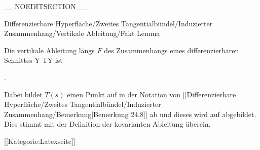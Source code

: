 __NOEDITSECTION__

{Differenzierbare Hyperfläche/Zweites Tangentialbündel/Induzierter Zusammenhang/Vertikale Ableitung/Fakt}
{Lemma}
{}
{

\faktzusatz {}
\faktzusatz {}

}
{

Die vertikale Ableitung längs $F$  des Zusammenhangs eines differenzierbaren Schnittes
 { Y } { TY
} {}
ist

 { . }

Dabei bildet $T(s)$ einen Punkt
 auf
  in der Notation von
[[Differenzierbare Hyperfläche/Zweites Tangentialbündel/Induzierter Zusammenhang/Bemerkung|Bemerkung 24.8]]
ab und dieses wird auf
 abgebildet. Dies stimmt mit der Definition der kovarianten Ableitung überein.

}

 [[Kategorie:Latexseite]]
